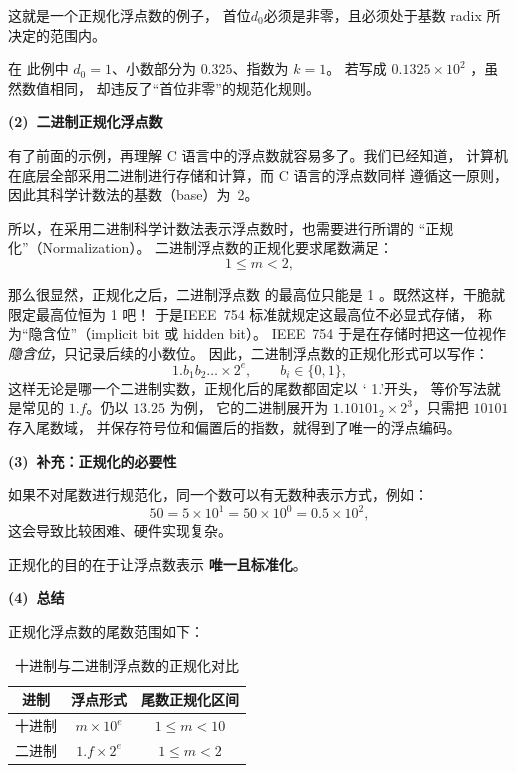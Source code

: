 这就是一个正规化浮点数的例子，
首位$d_0$必须是非零，且必须处于基数 radix 所决定的范围内。

在
此例中 $d_0 = 1$、小数部分为 $0.325$、指数为 $k = 1$。
若写成 $0.1325 \times 10^2$ ，虽然数值相同，
却违反了“首位非零”的规范化规则。

\vspace{1em}
\noindent\textbf{(2)~二进制正规化浮点数}\par\vspace{0.5em}

有了前面的示例，再理解 C 语言中的浮点数就容易多了。我们已经知道，
计算机在底层全部采用二进制进行存储和计算，而 C 语言的浮点数同样
遵循这一原则，因此其科学计数法的基数（base）为~2。

所以，在采用二进制科学计数法表示浮点数时，也需要进行所谓的
“正规化”（Normalization）。
二进制浮点数的正规化要求尾数满足：
\[
1 \le m < 2,
\]

那么很显然，正规化之后，二进制浮点数
的最高位只能是 1 。既然这样，干脆就限定最高位恒为 1 吧！
于是IEEE~754 标准就规定这最高位不必显式存储，
称为“隐含位”（implicit bit 或 hidden bit）。
IEEE~754 于是在存储时把这一位视作 \emph{隐含位}，只记录后续的小数位。
\newpage
因此，二进制浮点数的正规化形式可以写作：
\[
1.b_1b_2\ldots \times 2^e,\qquad b_i \in \{0,1\},
\]
这样无论是哪一个二进制实数，正规化后的尾数都固定以 ‘ 1.’开头，
等价写法就是常见的 $1.f$。仍以 $13.25$ 为例，
它的二进制展开为 $1.10101_2 \times 2^3$，只需把 $10101$ 存入尾数域，
并保存符号位和偏置后的指数，就得到了唯一的浮点编码。


\vspace{1em}
\noindent\textbf{(3)~补充：正规化的必要性}\par\vspace{0.5em}

如果不对尾数进行规范化，同一个数可以有无数种表示方式，例如：
\[
50 = 5 \times 10^{1} = 50 \times 10^{0} = 0.5 \times 10^{2},
\]
这会导致比较困难、硬件实现复杂。

正规化的目的在于让浮点数表示 \textbf{唯一且标准化}。


\vspace{1em}
\noindent\textbf{(4)~总结}\par\vspace{0.5em}


正规化浮点数的尾数范围如下：
\begin{table}[htbp]
\centering
\caption{十进制与二进制浮点数的正规化对比}
\label{tab:normalization-comparison}
\begin{tabular}{ccc}
\toprule
进制 & 浮点形式 & 尾数正规化区间 \\
\midrule
十进制 & $m \times 10^e$ & $1 \le m < 10$ \\
二进制 & $1.f \times 2^e$ & $1 \le m < 2$ \\
\bottomrule
\end{tabular}
\end{table}









